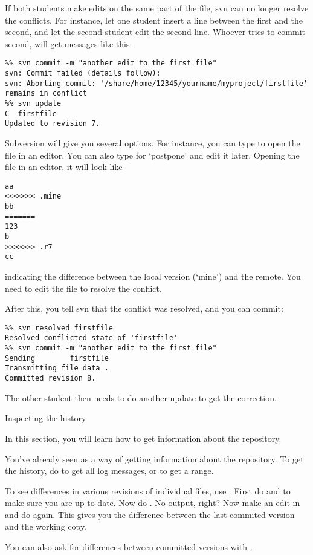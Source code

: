 If both students make edits on the same part of the file, svn can no
longer resolve the conflicts. For instance, let one student insert a
line between the first and the second, and let the second student edit
the second line. Whoever tries to commit second, will get messages
like this:
\begin{verbatim}
%% svn commit -m "another edit to the first file"
svn: Commit failed (details follow):
svn: Aborting commit: '/share/home/12345/yourname/myproject/firstfile' 
remains in conflict
%% svn update
C  firstfile
Updated to revision 7.
\end{verbatim}
Subversion will give you several options. For instance, you can type
 to open the file in an editor. You can also type  for
`postpone' and edit it later.
Opening the file in an editor, it will look like
\begin{verbatim}
aa
<<<<<<< .mine
bb
=======
123
b
>>>>>>> .r7
cc
\end{verbatim}
indicating the difference between the local version (`mine') and the
remote. You need to edit the file to resolve the conflict.

After this, you tell svn that the conflict was resolved, and
you can commit:
\begin{verbatim}
%% svn resolved firstfile
Resolved conflicted state of 'firstfile'
%% svn commit -m "another edit to the first file"
Sending        firstfile
Transmitting file data .
Committed revision 8.
\end{verbatim}
The other student then needs to do another update to get the
correction.

 {Inspecting the history}

\begin{purpose}
  In this section, you will learn how to get information about the repository.
\end{purpose}

You've already seen  as a way of getting information
about the repository. To get the history, do  to get all
log messages, or  to get a range.

To see differences in various revisions of individual files, use
. First do  and  to
make sure you are up to date. Now do . No
output, right? Now make an edit in  and do  again. This gives you the difference between the last
commited version and the working copy.

You can also ask for differences between committed versions with
.

